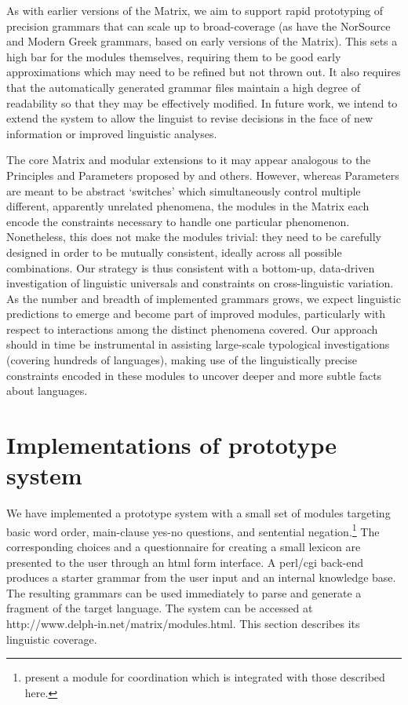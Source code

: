 \documentclass[11pt]{article}
\begin{document}
As with earlier versions of the Matrix, we aim to support rapid
prototyping of precision grammars that can scale up to broad-coverage
(as have the NorSource \cite{Hel:Hau:03} and Modern Greek
\cite{Kor:Neu:2003} grammars, based on early versions of the
Matrix). This sets a high bar for the modules themselves, requiring
them to be good early approximations which may need to be refined but
not thrown out.  It also requires that the automatically generated
grammar files maintain a high degree of readability so that they may
be effectively modified.  In future work, we intend 
to extend the system to allow the linguist to revise
decisions in the face of new information or improved linguistic
analyses.

The core Matrix and modular extensions to it may appear analogous to
the Principles and Parameters proposed by  and
others.  However, whereas Parameters are meant to be abstract
`switches' which simultaneously control multiple different, apparently
unrelated phenomena, the modules in the Matrix each encode the
constraints necessary to handle one particular phenomenon.
Nonetheless, this does not make the modules trivial: they need to be
carefully designed in order to be mutually consistent, ideally across
all possible combinations.  Our strategy is thus consistent with a
bottom-up, data-driven investigation of linguistic universals and
constraints on cross-linguistic variation.  As the number and breadth
of implemented grammars grows, we expect linguistic predictions to
emerge and become part of improved modules, particularly with respect
to interactions among the distinct phenomena covered.  Our approach
should in time be instrumental in assisting large-scale typological
investigations (covering hundreds of languages), making use of the
linguistically precise constraints encoded in these modules to uncover
deeper and more subtle facts about languages.

\section{Implementations of prototype system}
\label{imp}

We have implemented a prototype system with a small set of modules
targeting basic word order, main-clause yes-no questions, and
sentential negation.\footnote{ present a module
for coordination which is integrated with those described here.}  The
corresponding choices and a questionnaire for creating a small lexicon
are presented to the user through an html form interface. A perl/cgi
back-end produces a starter grammar from the user input and an
internal knowledge base.  The resulting grammars can be used
immediately to parse and generate a fragment of the target language.
The system can be accessed at
http://www.delph-in.net/matrix/modules.html.  This section describes
its linguistic coverage.
\end{document}
